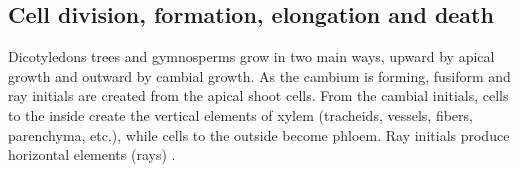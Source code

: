 \subsection{Cell division, formation, elongation and death}
Dicotyledons trees and gymnosperms grow in two main ways, upward by apical growth and
outward by cambial growth.  As the cambium is forming, fusiform and ray initials
are created from the apical shoot cells. From the cambial initials,
cells to the inside create the vertical elements of xylem (tracheids, vessels,
fibers, parenchyma, etc.), while cells to the outside become phloem. Ray
initials produce horizontal elements (rays) \cite{fromm2013cellular}.